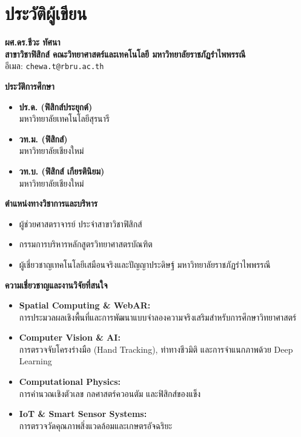 \chapter*{ประวัติผู้เขียน}

\vspace{0.4cm}
\begin{center}
    {\Large\bfseries ผศ.ดร.ชีวะ ทัศนา}\\[4pt]
    {\normalsize\bfseries สาขาวิชาฟิสิกส์ คณะวิทยาศาสตร์และเทคโนโลยี มหาวิทยาลัยราชภัฏรำไพพรรณี}\\[2pt]
    {\small อีเมล: \texttt{chewa.t@rbru.ac.th}}
\end{center}

\vspace{0.6cm}
\noindent
\begin{minipage}[t]{0.48\textwidth}
    \textbf{\large ประวัติการศึกษา}
    \begin{itemize}[leftmargin=1.2cm, itemsep=4pt]
        \item \textbf{ปร.ด. (ฟิสิกส์ประยุกต์)}\\
        มหาวิทยาลัยเทคโนโลยีสุรนารี
        \item \textbf{วท.ม. (ฟิสิกส์)}\\
        มหาวิทยาลัยเชียงใหม่
        \item \textbf{วท.บ. (ฟิสิกส์ เกียรตินิยม)}\\
        มหาวิทยาลัยเชียงใหม่
    \end{itemize}

    \vspace{0.4cm}
    \textbf{\large ตำแหน่งทางวิชาการและบริหาร}
    \begin{itemize}[leftmargin=1.2cm, itemsep=4pt]
        \item ผู้ช่วยศาสตราจารย์ ประจำสาขาวิชาฟิสิกส์
        \item กรรมการบริหารหลักสูตรวิทยาศาสตรบัณฑิต
        \item ผู้เชี่ยวชาญเทคโนโลยีเสมือนจริงและปัญญาประดิษฐ์ มหาวิทยาลัยราชภัฏรำไพพรรณี
    \end{itemize}
\end{minipage}
\hfill
\begin{minipage}[t]{0.48\textwidth}
    \textbf{\large ความเชี่ยวชาญและงานวิจัยที่สนใจ}
    \begin{itemize}[leftmargin=1.2cm, itemsep=4pt]
        \item \textbf{Spatial Computing \& WebAR:}\\
        การประมวลผลเชิงพื้นที่และการพัฒนาแบบจำลองความจริงเสริมสำหรับการศึกษาวิทยาศาสตร์
        \item \textbf{Computer Vision \& AI:}\\
        การตรวจจับโครงร่างมือ (Hand Tracking), ท่าทางชีวมิติ และการจำแนกภาพด้วย Deep Learning
        \item \textbf{Computational Physics:}\\
        การคำนวณเชิงตัวเลข กลศาสตร์ควอนตัม และฟิสิกส์ของแข็ง
        \item \textbf{IoT \& Smart Sensor Systems:}\\
        การตรวจวัดคุณภาพสิ่งแวดล้อมและเกษตรอัจฉริยะ
    \end{itemize}
\end{minipage}
